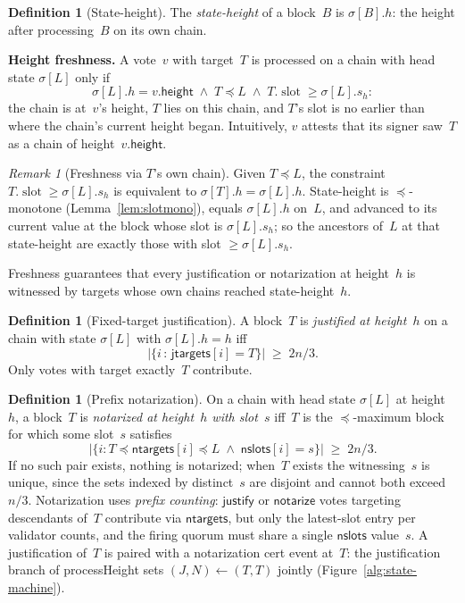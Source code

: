 \documentclass{article}
\newcommand{\slot}[0]{\ensuremath{\operatorname{\mathrm{slot}}}}
\newcommand{\height}{\mathsf{height}}
\newcommand{\just}{\ensuremath{\mathsf{justify}}\xspace}
\newcommand{\notar}{\ensuremath{\mathsf{notarize}}\xspace}
\newcommand{\jtargets}{\mathsf{jtargets}}
\newcommand{\ntargets}{\mathsf{ntargets}}
\newcommand{\nslots}{\mathsf{nslots}}
\newcommand{\processHeight}{\textsf{processHeight}\xspace}
\renewcommand{\paragraph}[1]{\vspace{7pt}\noindent\textbf{#1}}
\theoremstyle{plain}
\theoremstyle{definition}
\newtheorem{definition}[theorem]{Definition}
\theoremstyle{remark}
\newtheorem{remark}[theorem]{Remark}
\begin{document}
\begin{definition}[State-height]\label{def:sheight}
The \emph{state-height} of a block~$B$ is $\sigma[B].h$: the height after processing~$B$ on its own chain.
\end{definition}

\paragraph{Height freshness.}
A vote~$v$ with target~$T$ is processed on a chain with head state $\sigma[L]$ only if
\[
  \sigma[L].h = v.\height \;\wedge\; T \preceq L \;\wedge\; T.\slot \geq \sigma[L].s_h:
\]
the chain is at~$v$'s height, $T$ lies on this chain, and $T$'s slot is no earlier than where the chain's current height began.
Intuitively, $v$ attests that its signer saw~$T$ as a chain of height~$v.\height$.

\begin{remark}[Freshness via $T$'s own chain]\label{rem:fresh-equiv}
Given $T \preceq L$, the constraint $T.\slot \geq \sigma[L].s_h$ is equivalent to $\sigma[T].h = \sigma[L].h$.
State-height is $\preceq$-monotone (Lemma~\ref{lem:slotmono}), equals $\sigma[L].h$ on~$L$, and advanced to its current value at the block whose slot is $\sigma[L].s_h$; so the ancestors of~$L$ at that state-height are exactly those with slot $\geq \sigma[L].s_h$.
\end{remark}

Freshness guarantees that every justification or notarization at height~$h$ is witnessed by targets whose own chains reached state-height~$h$.

\begin{definition}[Fixed-target justification]\label{def:justification}
A block~$T$ is \emph{justified at height~$h$} on a chain with state $\sigma[L]$ with $\sigma[L].h = h$ iff
\[
  \bigl|\{i \,:\, \jtargets[i] = T\}\bigr| \;\geq\; 2n/3.
\]
Only votes with target exactly~$T$ contribute.
\end{definition}

\begin{definition}[Prefix notarization]\label{def:notarization}
On a chain with head state $\sigma[L]$ at height~$h$, a block~$T$ is \emph{notarized at height~$h$ with slot~$s$} iff~$T$ is the $\preceq$-maximum block for which some slot~$s$ satisfies
\[
  \bigl|\{i : T \preceq \ntargets[i] \preceq L \;\wedge\; \nslots[i] = s\}\bigr| \;\geq\; 2n/3.
\]
If no such pair exists, nothing is notarized; when~$T$ exists the witnessing~$s$ is unique, since the sets indexed by distinct~$s$ are disjoint and cannot both exceed~$n/3$.
Notarization uses \emph{prefix counting}: \just or \notar votes targeting descendants of~$T$ contribute via $\ntargets$, but only the latest-slot entry per validator counts, and the firing quorum must share a single $\nslots$ value~$s$.
A justification of~$T$ is paired with a notarization cert event at~$T$: the justification branch of \processHeight sets $(J, N) \gets (T, T)$ jointly (Figure~\ref{alg:state-machine}).
\end{definition}
\end{document}
